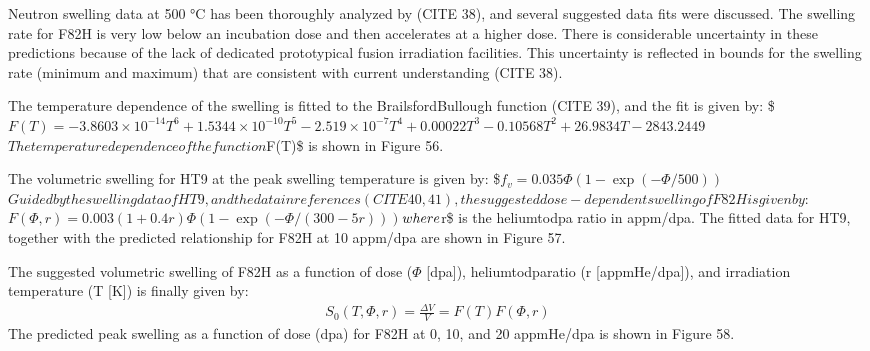 \documentclass[letterpaper,10pt,english]{jupyterBook}
\begin{document}
	\sphinxAtStartPar
	Neutron swelling data at 500 °C has been thoroughly analyzed by (CITE 38), and several suggested data fits were discussed. The swelling rate for F82H is very low below an incubation dose and then accelerates at a higher dose. There is considerable uncertainty in these predictions because of the lack of dedicated prototypical fusion irradiation facilities. This uncertainty is reflected in bounds for the swelling rate (minimum and maximum) that are consistent with current understanding (CITE 38).
	
	\sphinxAtStartPar
	The temperature dependence of the swelling is fitted to the Brailsford\sphinxhyphen{}Bullough function (CITE 39), and the fit is given by:
	\$\( F(T)=-3.8603\times 10^{-14}T^6+1.5344\times 10^{-10}T^5-2.519\times 10^{-7}T^4+0.00022T^3-0.10568 T^2+	26.9834 T-2843.2449 \)\(
	The temperature dependence of the function \)F(T)\$ is shown in Figure 56.
	
	\sphinxAtStartPar
	The volumetric swelling for HT9 at the peak swelling temperature is given by:
	\$\( f_v=0.035\Phi(1-\exp(-\Phi/500)) \)\(
	Guided by the swelling data of HT9, and the data in references (CITE 40, 41), the suggested dose-dependent swelling of F82H is given by:
	\)\( F(\Phi,r)=0.003(1+0.4r)\Phi(1-\exp(-\Phi/(300-5r))) \)\(
	\noindent where \)r\$ is the helium\sphinxhyphen{}to\sphinxhyphen{}dpa ratio in appm/dpa.  The fitted data for HT9, together with the predicted relationship for F82H at 10 appm/dpa are shown in Figure 57.
	
	\sphinxAtStartPar
	The suggested volumetric swelling of F82H as a function of dose (\(\Phi\) {[}dpa{]}), helium\sphinxhyphen{}to\sphinxhyphen{}dpa\sphinxhyphen{}ratio (r {[}appmHe/dpa{]}), and irradiation temperature (T {[}K{]}) is finally given by:
	\begin{equation*}
		\begin{split} S_0(T,\Phi,r)=\frac{\Delta V}{V}=F(T)F(\Phi,r) \end{split}
	\end{equation*}
	\sphinxAtStartPar
	The predicted peak swelling as a function of dose (dpa) for F82H at 0, 10, and 20 appmHe/dpa is shown in Figure 58.
	
\end{document}
